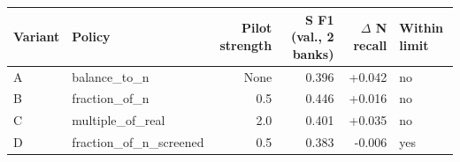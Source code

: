\begin{tabular}{llrrrl}
\toprule
Variant & Policy & Pilot strength & S F1 (val., 2 banks) & $\Delta$ N recall & Within limit \\
\midrule
A & balance\_to\_n & None & 0.396 & +0.042 & no \\
B & fraction\_of\_n & 0.5 & 0.446 & +0.016 & no \\
C & multiple\_of\_real & 2.0 & 0.401 & +0.035 & no \\
D & fraction\_of\_n\_screened & 0.5 & 0.383 & -0.006 & yes \\
\bottomrule
\end{tabular}

